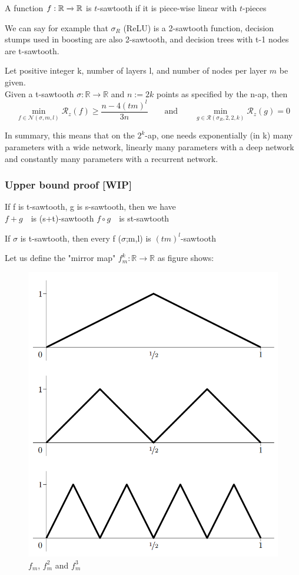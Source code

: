 \documentclass{article}
\begin{document}
\begin{defn}[Sawtooth]
A function $f: \mathbb{R} \xrightarrow{} \mathbb{R}$ is $t$-sawtooth if it is piece-wise linear with $t$-pieces
\end{defn}
We can say for example that $\sigma_R$ (ReLU) is a 2-sawtooth function, decision stumps used in boosting are also 2-sawtooth, and decision trees with t-1 nodes are t-sawtooth.

\begin{thm}
Let positive integer k, number of layers l, and number of nodes per layer $m$ be given. \\
Given a t-sawtooth $\sigma : \mathbb{R} \to \mathbb{R}$ and $n := 2k$ points as specified by the n-ap, then \\
$$\min_{f\in\mathscr{N}(\sigma, m, l)} \mathcal{R}_z(f) \geq \frac{n-4(tm)^l}{3n} \quad \quad \text{and} \quad \quad \min_{g\in\mathscr{R}(\sigma_R, 2, 2, k)} \mathcal{R}_z(g) = 0$$
\end{thm}
In summary, this means that on the $2^k$-ap, one needs exponentially (in k) many parameters with a wide network, linearly many parameters with a deep network and constantly many parameters with a recurrent network.

\subsubsection{Upper bound proof [WIP]}
\begin{lemma}
If f is t-sawtooth, g is s-sawtooth, then we have \\
$f+g$\ \ is (s+t)-sawtooth \quad \quad \quad $f\circ g$\ \ is st-sawtooth
\end{lemma}
\begin{lemma}
If $\sigma$ is t-sawtooth, then every f \in {}($\sigma$;m,l) is $(tm)^l$-sawtooth
\end{lemma}

Let us define the "mirror map" $f^k_m: \mathbb{R}\to\mathbb{R}$ as figure shows:
\begin{figure}[H]
    \centering
    \includegraphics[width=.6\textwidth]{figures/fmk.png}
    \caption{$f_m$, $f^2_m$ and $f^3_m$ \cite{telgarsky2015representation}}
\end{figure}
\end{document}
